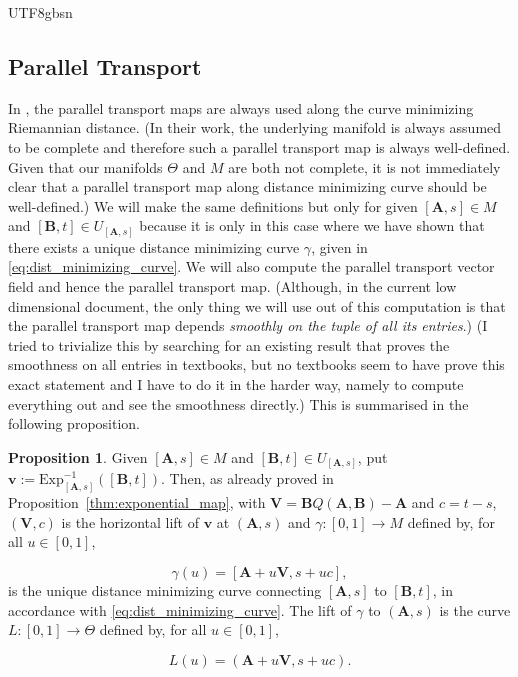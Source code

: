 \documentclass[12pt]{report}
\theoremstyle{plain}
\theoremstyle{definition}
\newtheorem{proposition}[theorem]{Proposition}
\begin{document}
\begin{CJK*}{UTF8}{gbsn}
\subsection{Parallel Transport}
In \cite{Sun_Lin_Liu_2026},
the parallel transport maps are always used along 
the curve minimizing Riemannian distance.
(In their work, the underlying manifold is always assumed to be 
complete and therefore such a parallel transport map is 
always well-defined.
Given that our manifolds $\Theta$ and $M$ are both not complete,
it is not immediately clear that a parallel transport map along 
distance minimizing curve should be well-defined.)
We will make the same definitions
but only for given $[\bm{A},s] \in M$ and $[\bm{B}, t] \in U_{[\bm{A},s]}$
because it is only in this case where we have shown that 
there exists a unique 
distance minimizing curve $\gamma$, given in
\eqref{eq:dist_minimizing_curve}.
We will also compute the parallel transport vector field 
and hence the parallel transport map.
(Although, in the current low dimensional document, 
the only thing we will use out of this computation 
is that the parallel transport map depends 
\textit{smoothly on the tuple of all its entries}.)
(I tried to trivialize this by searching for an existing result that proves the smoothness 
on all entries in textbooks, but no textbooks seem to have prove 
this exact statement and I have to do it in the harder way,
namely to compute everything out and see the smoothness directly.)
This is summarised in the following proposition.

\begin{proposition}\label{thm:parallel_transport}
Given $[\bm{A},s] \in M$ and $[\bm{B}, t] \in U_{[\bm{A},s]}$,
put $\bm{v} := \text{Exp}^{-1}_{[\bm{A},s]}([\bm{B}, t])$.
Then, as already proved in 
Proposition~\ref{thm:exponential_map},
with $\bm{V} = \bm{B}Q(\bm{A}, \bm{B}) - \bm{A}$
and $c = t - s$, $(\bm{V}, c)$ is the horizontal lift of $\bm{v}$ at $(\bm{A},s)$
and $\gamma: [0,1] \to M$ defined by, for all $u \in [0,1]$,

\begin{equation*}
  \gamma(u) = [\bm{A} + u \bm{V}, s + uc],
\end{equation*}
is the 
unique distance minimizing curve connecting $[\bm{A},s]$ to $[\bm{B}, t]$,
in accordance with 
\eqref{eq:dist_minimizing_curve}.
The lift of $\gamma$ to $(\bm{A},s)$ 
is the curve $L:[0,1] \to \Theta$ defined by, for all $u \in [0,1]$,

\begin{equation*}
  L(u) = (\bm{A} + u \bm{V}, s + uc).
\end{equation*}


\end{proposition}
\end{CJK*}
\end{document}
